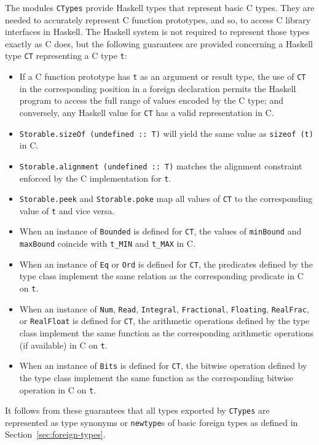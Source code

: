 \documentclass[a4paper,twoside]{article}
\newcommand{\code}[1]{\texttt{#1}}      %
\begin{document}
The modules \code{CTypes} provide Haskell types that represent basic C types.
They are needed to accurately represent C function prototypes, and so, to
access C library interfaces in Haskell.  The Haskell system is not required to
represent those types exactly as C does, but the following guarantees are
provided concerning a Haskell type \code{CT} representing a C type \code{t}:
%
\begin{itemize}
\item If a C function prototype has \code{t} as an argument or result type,
  the use of \code{CT} in the corresponding position in a foreign declaration
  permits the Haskell program to access the full range of values encoded by
  the C type; and conversely, any Haskell value for \code{CT} has a valid
  representation in C.
\item \code{Storable.sizeOf (undefined ::\ T)} will yield the same value as
  \code{sizeof (t)} in C.
\item \code{Storable.alignment (undefined ::\ T)} matches the alignment
  constraint enforced by the C implementation for \code{t}.
\item \code{Storable.peek} and \code{Storable.poke} map all values of
  \code{CT} to the corresponding value of \code{t} and vice versa.
\item When an instance of \code{Bounded} is defined for \code{CT}, the values
  of \code{minBound} and \code{maxBound} coincide with \code{t\_MIN} and
  \code{t\_MAX} in C.
\item When an instance of \code{Eq} or \code{Ord} is defined for \code{CT},
  the predicates defined by the type class implement the same relation as the
  corresponding predicate in C on \code{t}.
\item When an instance of \code{Num}, \code{Read}, \code{Integral},
  \code{Fractional}, \code{Floating}, \code{RealFrac}, or \code{RealFloat} is
  defined for \code{CT}, the arithmetic operations defined by the type class
  implement the same function as the corresponding arithmetic operations (if
  available) in C on \code{t}.
\item When an instance of \code{Bits} is defined for \code{CT}, the bitwise
  operation defined by the type class implement the same function as the
  corresponding bitwise operation in C on \code{t}.
\end{itemize}
%
It follows from these guarantees that all types exported by \code{CTypes} are
represented as type synonyms or \code{newtype}s of basic foreign types as
defined in Section~\ref{sec:foreign-types}.
\end{document}
